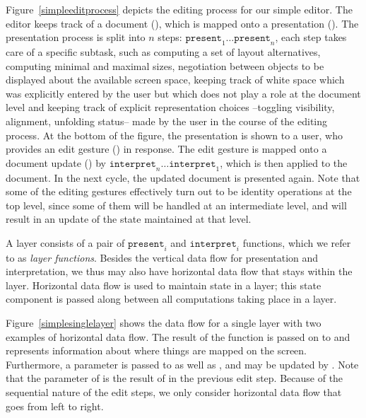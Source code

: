 \documentclass[preprint,natbib]{sigplanconf}
\begin{document}
Figure~\ref{simpleeditprocess} depicts the editing process for our simple editor. The editor keeps track of a document (), which is mapped onto a presentation (). The presentation process is split into $n$ steps: $\mathtt{present}_1 \dots \mathtt{present}_{n}$, each step takes care of a specific subtask, such as computing a set of layout alternatives, computing minimal and maximal sizes, negotiation between objects to be displayed about the available screen space, keeping track of white space which was explicitly entered by the user but which does not play a role at the document level and keeping track of explicit representation choices --toggling visibility, alignment, unfolding status-- made by the user in the course of the editing process. At the bottom of the figure, the presentation is shown to a user, who provides an edit gesture () in response. The edit gesture is mapped onto a document update () by $\mathtt{interpret}_{n} \dots \mathtt{interpret}_1$, which is then applied to the document. In the next cycle, the updated document is presented again. Note that some of the editing gestures effectively turn out to be identity operations at the top level, since some of them will be handled at an intermediate level, and will result in an update of the state maintained at that level.


A layer consists of a pair of $\mathtt{present}_i$ and $\mathtt{interpret}_i$ functions, which we refer to as {\em layer functions}. Besides the vertical data flow for presentation and interpretation, we thus may also have horizontal data flow that stays within the layer. Horizontal data flow is used to maintain state in a layer; this state component is passed along between all  computations taking place in a layer.


Figure~\ref{simplesinglelayer} shows the data flow for a single layer with two examples of horizontal data flow. The result  of the function  is passed on to  and represents information about where things are mapped on the screen. Furthermore, a  parameter is passed to  as well as , and may be updated by . Note that the  parameter of  is the result of  in the previous edit step. Because of the sequential nature of the edit steps, we only consider horizontal data flow that goes from left to right.
\end{document}
